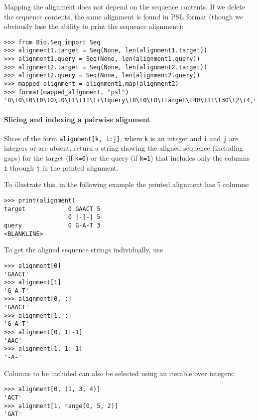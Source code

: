 Mapping the alignment does not depend on the sequence contents. If we delete
the sequence contents, the same alignment is found in PSL format (though we
obviously lose the ability to print the sequence alignment):

\begin{verbatim}
>>> from Bio.Seq import Seq
>>> alignment1.target = Seq(None, len(alignment1.target))
>>> alignment1.query = Seq(None, len(alignment1.query))
>>> alignment2.target = Seq(None, len(alignment2.target))
>>> alignment2.query = Seq(None, len(alignment2.query))
>>> mapped_alignment = alignment1.map(alignment2)
>>> format(mapped_alignment, "psl")
'8\t0\t0\t0\t0\t0\t1\t11\t+\tquery\t8\t0\t8\ttarget\t40\t11\t30\t2\t4,4,\t0,4,\t11,26,\n'
\end{verbatim}

\paragraph*{Slicing and indexing a pairwise alignment}

Slices of the form \verb+alignment[k, i:j]+, where \verb+k+ is an integer and \verb+i+ and \verb+j+ are integers or are absent, return a string showing the aligned sequence (including gaps) for the target (if \verb+k=0+) or the query (if \verb+k=1+) that includes only the columns \verb+i+ through \verb+j+ in the printed alignment.

To illustrate this, in the following example the printed alignment has 5 columns:

\begin{verbatim}
>>> print(alignment)
target            0 GAACT 5
                  0 |-|-| 5
query             0 G-A-T 3
<BLANKLINE>
\end{verbatim}

To get the aligned sequence strings individually, use
\begin{verbatim}
>>> alignment[0]
'GAACT'
>>> alignment[1]
'G-A-T'
>>> alignment[0, :]
'GAACT'
>>> alignment[1, :]
'G-A-T'
>>> alignment[0, 1:-1]
'AAC'
>>> alignment[1, 1:-1]
'-A-'
\end{verbatim}

Columns to be included can also be selected using an iterable over integers:
\begin{verbatim}
>>> alignment[0, (1, 3, 4)]
'ACT'
>>> alignment[1, range(0, 5, 2)]
'GAT'
\end{verbatim}

